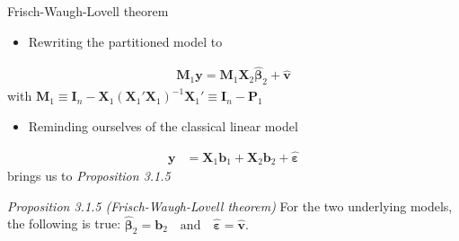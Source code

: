 \documentclass[xcolor=dvipsnames]{beamer}
\begin{document}
\begin{frame}{Frisch-Waugh-Lovell theorem}
\begin{itemize}
    \item Rewriting the partitioned model to
\end{itemize}
\begin{align*}
    \mathbf{M}_1\mathbf{y} =
    \mathbf{M}_1\mathbf{X}_2\hat{\boldsymbol{\beta}}_2+\hat{\mathbf{v}}
\end{align*}
with $\mathbf{M}_1 \equiv \mathbf{I}_n-\mathbf{X}_1(\mathbf{X}_1'\mathbf{X}_1)^{-1}\mathbf{X}_1' \equiv \mathbf{I}_n - \mathbf{P}_1$
\newline
\pause
\begin{itemize}
    \item Reminding ourselves of the classical linear model
\end{itemize}
\begin{align*}
  \mathbf{y} &= \mathbf{X}_1\mathbf{b}_1+\mathbf{X}_2\mathbf{b}_2+\hat{\boldsymbol{\varepsilon}}
\end{align*}
brings us to \textit{Proposition 3.1.5}

\begin{block}{\textit{Proposition 3.1.5 (Frisch-Waugh-Lovell theorem)}}
For the two underlying models, the following is true:
$\hat{\boldsymbol{\beta}}_2=\mathbf{b}_2\quad\text{and}\quad \hat{\boldsymbol{\varepsilon}}=\hat{\mathbf{v}}.$
\end{block}
\end{frame}


\end{document}
